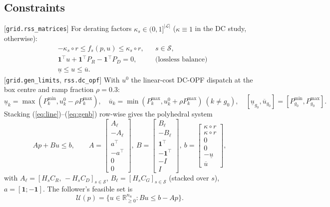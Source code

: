\subsection{Constraints}
[\texttt{grid.rss\_matrices}] For derating factors $\kappa_s\in(0,1]^{|\mathcal L|}$
($\kappa\equiv1$ in the DC study,  otherwise):
\begin{align}
&-\kappa_s\circ r\le f_s(p,u)\le\kappa_s\circ r, && s\in\mathcal S, \label{eq:line}\\
&\mathbf 1^\top u+\mathbf 1^\top P_R-\mathbf 1^\top P_D=0, && \text{(lossless balance)} \label{eq:bal}\\
&\underline u\le u\le\overline u. && \label{eq:genb}
\end{align}
[\texttt{grid.gen\_limits}, \texttt{rss.dc\_opf}] With $u^0$ the linear-cost DC-OPF dispatch at
the box centre and ramp fraction $\rho=0.3$:
\begin{equation}
\underline u_k=\max(P^{\min}_k,u^0_k-\rho P^{\max}_k),\quad
\overline u_k=\min(P^{\max}_k,u^0_k+\rho P^{\max}_k)\ (k\neq g_0),\quad
[\underline u_{g_0},\overline u_{g_0}]=[P^{\min}_{g_0},P^{\max}_{g_0}].
\label{eq:ramp}
\end{equation}
Stacking (\ref{eq:line})--(\ref{eq:genb}) row-wise gives the polyhedral system
\begin{equation}
Ap+Bu\le b,\qquad
A=\begin{bmatrix}A_\ell\\-A_\ell\\ a^\top\\-a^\top\\0\\0\end{bmatrix},\
B=\begin{bmatrix}B_\ell\\-B_\ell\\ \mathbf 1^\top\\-\mathbf 1^\top\\-I\\I\end{bmatrix},\
b=\begin{bmatrix}\kappa\circ r\\ \kappa\circ r\\0\\0\\-\underline u\\ \overline u\end{bmatrix},
\label{eq:Abb}
\end{equation}
with $A_\ell=[H_sC_R,\,-H_sC_D]_{s\in\mathcal S}$, $B_\ell=[H_sC_G]_{s\in\mathcal S}$
(stacked over $s$), $a=[\mathbf 1;-\mathbf 1]$. The follower's feasible set is
\begin{equation}
\mathcal U(p)=\{u\in\mathbb R^{n_u}_{\ge0}: Bu\le b-Ap\}.
\label{eq:U}
\end{equation}

